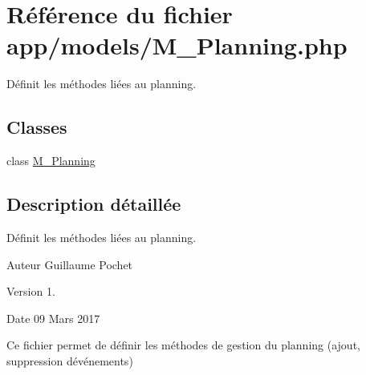\hypertarget{_m___planning_8php}{}\section{Référence du fichier app/models/\+M\+\_\+\+Planning.php}
\label{_m___planning_8php}


Définit les méthodes liées au planning.  


\subsection*{Classes}
\begin{DoxyCompactItemize}
\item 
class \hyperlink{class_m___planning}{M\+\_\+\+Planning}
\end{DoxyCompactItemize}


\subsection{Description détaillée}
Définit les méthodes liées au planning. 

\begin{DoxyAuthor}{Auteur}
Guillaume Pochet 
\end{DoxyAuthor}
\begin{DoxyVersion}{Version}
1. 
\end{DoxyVersion}
\begin{DoxyDate}{Date}
09 Mars 2017
\end{DoxyDate}
Ce fichier permet de définir les méthodes de gestion du planning (ajout, suppression d\textquotesingle{}événements) 
